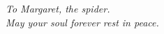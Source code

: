 {
\noindent
\raggedleft
\emph{To Margaret, the spider.\\May your soul forever rest in peace.}\\
\clearpage
}
